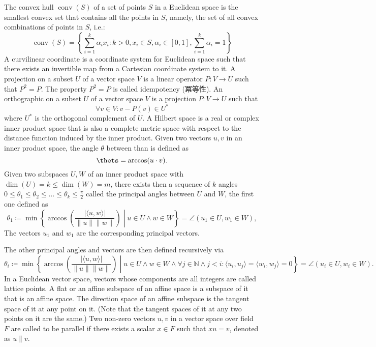 \documentclass[a4paper,12pt]{article}
\begin{document}
The convex hull $\operatorname{conv} (S)$ of a set of points $S$ in a Euclidean space is the smallest convex set that contains all the points in $S$, namely, the set of all convex combinations of points in $S$, i.e.:
\[\operatorname{conv}(S)=\left\{\sum _{i=1}^k\alpha _ix_i\colon k>0,x_i\in S,\alpha _i\in [0,1],\sum _{i=1}^k\alpha _i=1\right\}\]
A curvilinear coordinate is a coordinate system for Euclidean space such that there exists an invertible map from a Cartesian coordinate system to it.
A projection on a subset $U$ of a vector space $V$ is a linear operator $P\colon V\to U$ such that $P^2=P$. The property $P^2=P$ is called idempotency (冪等性).
An orthographic on a subset $U$ of a vector space $V$ is a projection $P\colon V\to U$  such that 
\[ \forall v\in V\colon v - P(v)\in U^*\]
where $U^*$ is the orthogonal complement of \( U \).
A Hilbert space is a real or complex inner product space that is also a complete metric space with respect to the distance function induced by the inner product.
Given two vectors $u,v$ in an inner product space, the angle $\theta$ between than is defined as
\[\thets=\arccos(u\cdot v).\]
Given two subspaces $U,W$ of an inner product space with $\dim(U)=k\leq\dim(W)=m$, there exists then a sequence of $k$ angles $0\leq\theta_1\leq\theta_2\leq\ldots\leq\theta_k\leq\frac{\pi}{2}$ called the principal angles between $U$ and $W$, the first one defined as
\[\theta_1\coloneq\min\left\{\arccos\left(\frac{|\langle u,w\rangle|}{\|u\|\|w\|}\right)\middle |u\in U\land w\in W\right\}=\angle(u_1\in U,w_1\in W),\]
The vectors $u_1$ and $w_1$ are the corresponding principal vectors.

The other principal angles and vectors are then defined recursively via
\[\theta_i\coloneq\min\left\{\arccos\left(\frac{|\langle u,w\rangle|}{\|u\|\|w\|}\right)\middle |u\in U\land w\in W\land \forall j\in\mathbb{N}\land j<i\colon\langle u_i,u_j\rangle=\langle w_i,w_j\rangle=0\right\}=\angle(u_i\in U,w_i\in W).\]
In a Euclidean vector space, vectors whose components are all integers are called lattice points.
A flat or an affine subspace of an affine space is a subspace of it that is an affine space.
The direction space of an affine subspace is the tangent space of it at any point on it. (Note that the tangent spaces of it at any two points on it are the same.)
Two non-zero vectors $u,v$ in a vector space over field $F$ are called to be parallel if there exists a scalar $x\in F$ such that $xu=v$, denoted as $u\parallel v$.
\end{document}
